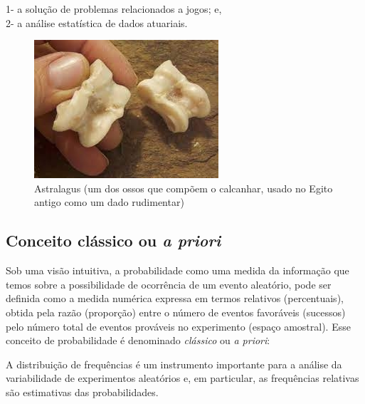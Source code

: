 \documentclass[
]{book}
\begin{document}
\hfill\break

1- a solução de problemas relacionados a jogos; e,\\
2- a análise estatística de dados atuariais.

\hfill\break

\begin{figure}

{\centering \includegraphics[width=0.8\linewidth]{images4/astralagus} 

}

\caption{Astralagus (um dos ossos que compõem o calcanhar, usado no Egito antigo como um dado rudimentar)}\label{fig:unnamed-chunk-56}
\end{figure}

\hypertarget{conceito-cluxe1ssico-ou-a-priori}{%
\subsection{\texorpdfstring{Conceito clássico ou \emph{a priori}}{Conceito clássico ou a priori}}\label{conceito-cluxe1ssico-ou-a-priori}}

Sob uma visão intuitiva, a probabilidade como uma medida da informação que temos sobre a possibilidade de ocorrência de um evento aleatório, pode ser definida como a medida numérica expressa em termos relativos (percentuais), obtida pela razão (proporção) entre o número de eventos favoráveis (sucessos) pelo número total de eventos prováveis no experimento (espaço amostral). Esse conceito de probabilidade é denominado \emph{clássico} ou \emph{a priori}:

\hfill\break

A distribuição de frequências é um instrumento importante para a análise da variabilidade de experimentos aleatórios e, em particular, as frequências relativas são estimativas das probabilidades.
\end{document}
